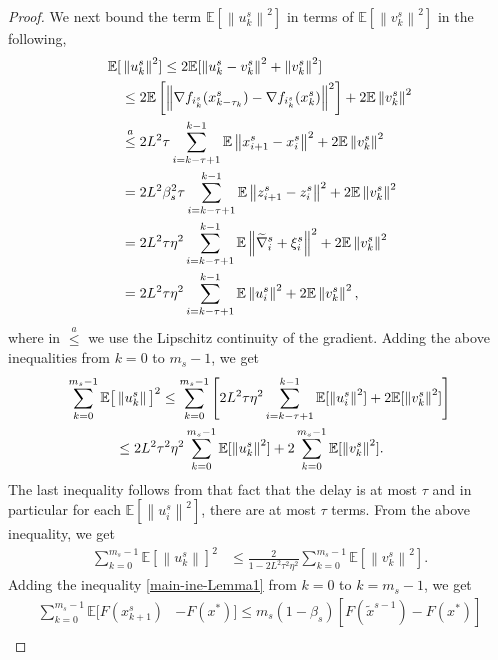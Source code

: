 \documentclass[conference]{IEEEtran}
\newcommand*{\E}{\mathbb{E}}
\newcommand{\norm}[1]{\left\lVert#1\right\rVert}
\theoremstyle{definition}
\theoremstyle{remark}
\begin{document}
\begin{proof}
We next bound the term $\E[\norm{u_k^s}^2]$ in terms of $\E[\norm{v_k^s}^2]$ in the following,
\begin{gather}
\begin{split}
\E[&\norm{u^s_k}^2]\leq 2\E[\norm{u^s_k-v^s_k}^2+\norm{v^s_k}^2]\\
&\leq 2\E\left[\norm{ \nabla f_{i_k^s}(x_{k-\tau_k}^s) - \nabla f_{i_k^s}(x_{k}^s)}^2\right] + 2\E\norm{v^s_k}^2\\
&\stackrel{a}{\leq} 2 {L}^2\tau \sum_{i=k-\tau+1}^{k-1}\E\norm{x_{i+1}^s-x_{i}^s}^2+ 2\E\norm{v^s_k}^2\\
&= 2 {L}^2\beta_s^2\tau \sum_{i=k-\tau+1}^{k-1}\E\norm{z_{i+1}^s-z_{i}^s}^2+ 2\E\norm{v^s_k}^2\\
&= 2 {L}^2\tau \eta^2\sum_{i=k-\tau+1}^{k-1} \E\norm{\widetilde{\nabla}_{i}^s+\xi_{i}^s}^2+ 2\E\norm{v^s_k}^2\\
&= 2 {L}^2\tau \eta^2\sum_{i=k-\tau+1}^{k-1} \E\norm{u^s_i}^2+ 2\E\norm{v^s_k}^2,
\end{split}
\raisetag{20pt}
\end{gather}
where in $\stackrel{a}{\leq}$ we use the Lipschitz
continuity of the gradient. 
Adding the above inequalities
from $k=0$ to $m_s-1$, we get
\begin{gather}
\begin{split}
\sum_{k=0}^{m_s-1}\E\big[&\norm{u^s_k}\big]^2\leq \sum_{k=0}^{m_s-1}\left[2L^2 \tau\eta^2\sum_{i=k-\tau+1}^{k-1} \E[\norm{u^s_i}^2]+2\E[\norm{v^s_k}^2]\right]\\
&\leq 2L^2 \tau^2\eta^2\sum_{k=0}^{m_s-1}\E[\norm{u^s_k}^2]+2\sum_{k=0}^{m_s-1}\E[\norm{v^s_k}^2].
\end{split}
\raisetag{20pt}
\end{gather}
The last inequality follows from that fact that the delay is at most $\tau$ and in particular for each  $\E[\norm{u^s_i}^2]$, there are at most $\tau$ terms. From the above inequality, we get 
\begin{equation}\label{Eq6-Lemma1}
\begin{split}
\sum_{k=0}^{m_s-1} \E[\norm{u^s_k}]^2&\leq \frac{2}{1-2L^2 \tau^2\eta^2}\sum_{k=0}^{m_s-1}\E[\norm{v^s_k}^2].
\end{split}
\end{equation}
Adding the inequality \eqref{main-ine-Lemma1} from $k=0$ to $k=m_s-1$, we get
\begin{equation}\label{lemma-finaleq1-1}
\begin{split}
\sum_{k=0}^{m_s-1}\E[F(x_{k+1}^s)&-F(x^*)] \leq m_s(1-\beta_s)[F(\widetilde{x}^{s-1})-F(x^*)]\\

\end{split}
\end{equation}
\end{proof}
\end{document}
